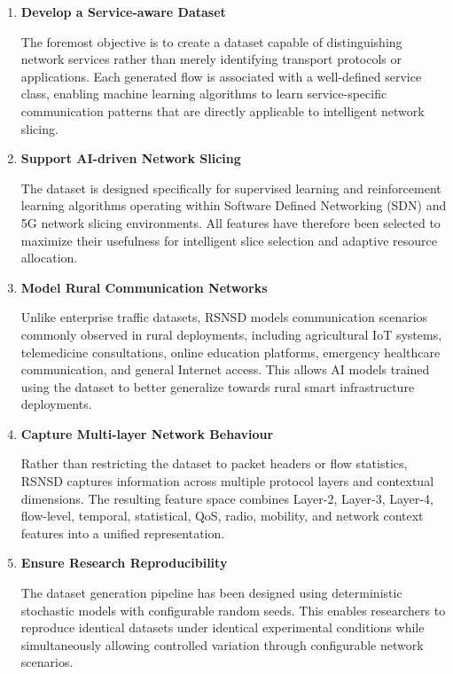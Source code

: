 \documentclass[12pt,a4paper]{article}
\begin{document}
\begin{enumerate}
	
	\item \textbf{Develop a Service-aware Dataset}
	
	The foremost objective is to create a dataset capable of distinguishing network services rather than merely identifying transport protocols or applications. Each generated flow is associated with a well-defined service class, enabling machine learning algorithms to learn service-specific communication patterns that are directly applicable to intelligent network slicing.
	
	\item \textbf{Support AI-driven Network Slicing}
	
	The dataset is designed specifically for supervised learning and reinforcement learning algorithms operating within Software Defined Networking (SDN) and 5G network slicing environments. All features have therefore been selected to maximize their usefulness for intelligent slice selection and adaptive resource allocation.
	
	\item \textbf{Model Rural Communication Networks}
	
	Unlike enterprise traffic datasets, RSNSD models communication scenarios commonly observed in rural deployments, including agricultural IoT systems, telemedicine consultations, online education platforms, emergency healthcare communication, and general Internet access. This allows AI models trained using the dataset to better generalize towards rural smart infrastructure deployments.
	
	\item \textbf{Capture Multi-layer Network Behaviour}
	
	Rather than restricting the dataset to packet headers or flow statistics, RSNSD captures information across multiple protocol layers and contextual dimensions. The resulting feature space combines Layer-2, Layer-3, Layer-4, flow-level, temporal, statistical, QoS, radio, mobility, and network context features into a unified representation.
	
	\item \textbf{Ensure Research Reproducibility}
	
	The dataset generation pipeline has been designed using deterministic stochastic models with configurable random seeds. This enables researchers to reproduce identical datasets under identical experimental conditions while simultaneously allowing controlled variation through configurable network scenarios.
	
\end{enumerate}
\end{document}
